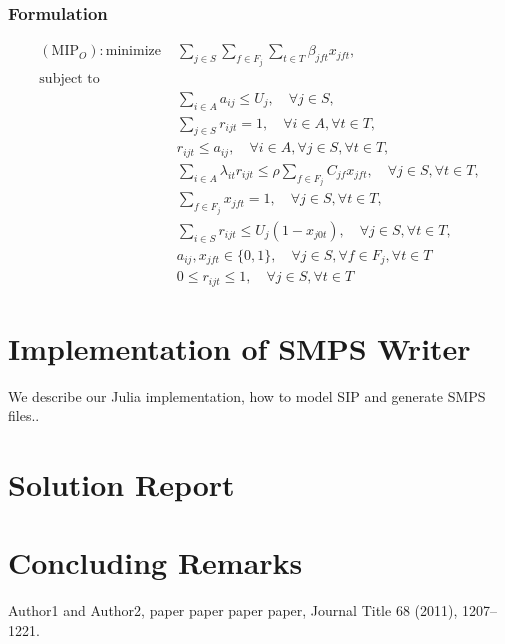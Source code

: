 \subsubsection{Formulation}
\begin{align}
(\textrm{MIP}_O): \textrm{minimize    } &\sum_{j\in S}\sum_{f\in F_j}\sum_{t\in T}\beta_{jft}x_{jft},\\
\textrm{subject to} \nonumber\\ 
&\sum_{i\in A}a_{ij} \le U_j, \quad \forall j\in S,\\
&\sum_{j\in S}r_{ijt}=1, \quad \forall i\in A, \forall t\in T,\\
&r_{ijt} \le a_{ij}, \quad \forall i\in A, \forall j\in S, \forall t\in T, \\
&\sum_{i\in A}\lambda_{it}r_{ijt} \le \rho \sum_{f\in F_j}C_{jf}x_{jft}, \quad \forall j\in S, \forall t\in T,\\
&\sum_{f\in F_j}x_{jft}=1, \quad \forall j\in S, \forall t\in T, \\
&\sum_{i\in S}r_{ijt} \le U_j(1-x_{j0t}), \quad \forall j\in S, \forall t\in T, \\
&a_{ij}, x_{jft}\in \{0,1\}, \quad \forall j\in S, \forall f\in F_j, \forall t\in T  \\
&0 \le r_{ijt} \le 1, \quad \forall j\in S, \forall t\in T
\end{align}
\section{Implementation of SMPS Writer}

We describe our Julia implementation, how to model SIP and generate SMPS files..

\section{Solution Report}

\section{Concluding Remarks}


\begin{thebibliography}{9} 
	Author1 and Author2, paper paper paper paper, Journal Title 68 (2011), 1207--1221.
\end{thebibliography}


